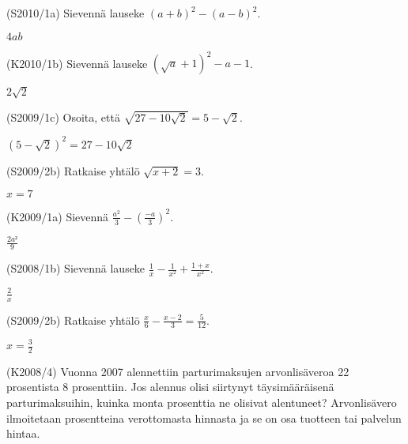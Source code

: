 \begin{tehtava}(S2010/1a) Sievennä lauseke $(a + b)^2 - (a - b)^2$.
\begin{vastaus}
				$4ab$
				\end{vastaus}
\end{tehtava}

\begin{tehtava}(K2010/1b) Sievennä lauseke $ (\sqrt{a} + 1)^2 - a - 1 $.
\begin{vastaus}
				$2\sqrt{2}$
				\end{vastaus}
\end{tehtava}

\begin{tehtava}(S2009/1c) Osoita, että $\sqrt{27 - 10 \sqrt{2}} = 5 - \sqrt{2} $.
\begin{vastaus}
				$(5-\sqrt{2})^2=27-10\sqrt{2}$ %
				\end{vastaus}
\end{tehtava}

\begin{tehtava}(S2009/2b)  Ratkaise yhtälö $ \sqrt{x + 2 } = 3$.
\begin{vastaus}
				$x=7$
				\end{vastaus}
\end{tehtava}

\begin{tehtava}(K2009/1a)  Sievennä $ \frac{a^2}{3} - \left( \frac{-a}{3} \right)^2 $.
\begin{vastaus}
				$\frac{2a²}{9}$
				\end{vastaus}
\end{tehtava}

\begin{tehtava}(S2008/1b)  Sievennä lauseke $\frac{1}{x} - \frac{1}{x^2} + \frac{1 + x}{x^2}$.
                        \begin{vastaus}
				$\frac{2}{x}$
				\end{vastaus}
\end{tehtava}

\begin{tehtava}(S2009/2b)  Ratkaise yhtälö $\frac{x}{6} - \frac{x - 2}{3} = \frac{5}{12}$.
                        \begin{vastaus}
				$x=\frac{3}{2}$
				\end{vastaus}
\end{tehtava}

\begin{tehtava}(K2008/4) Vuonna 2007 alennettiin parturimaksujen arvonlisäveroa 22 prosentista 8 prosenttiin. Jos alennus olisi siirtynyt täysimääräisenä parturimaksuihin, kuinka monta prosenttia ne olisivat alentuneet? Arvonlisävero ilmoitetaan prosentteina verottomasta hinnasta ja se on osa tuotteen tai palvelun hintaa.
\end{tehtava}

